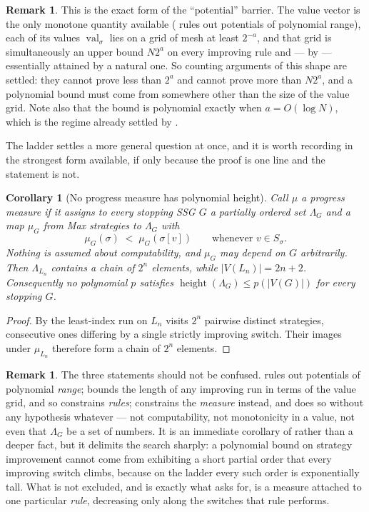 \documentclass[11pt]{article}
\theoremstyle{plain}
\newtheorem{corollary}[theorem]{Corollary}
\theoremstyle{definition}
\newtheorem{remark}[theorem]{Remark}
\DeclareMathOperator{\val}{val}
\begin{document}
\begin{remark}
This is the exact form of the ``potential'' barrier. The value vector is
the only monotone quantity available ( rules out
potentials of polynomial range), each of its values $\val_\sigma$ lies on
a grid of mesh at least $2^{-a}$, and
that grid is simultaneously an upper bound $N2^{a}$ on every improving
rule and --- by  --- essentially attained by a natural
one. So counting arguments of this shape are settled: they cannot prove
less than $2^{a}$ and cannot prove more than $N2^{a}$, and a polynomial
bound must come from somewhere other than the size of the value grid.
Note also that the bound is polynomial exactly when $a=O(\log N)$, which
is the regime already settled by .
\end{remark}

The ladder settles a more general question at once, and it is worth
recording in the strongest form available, if only because the proof is
one line and the statement is not.

\begin{corollary}[No progress measure has polynomial height]\label{cor:no-height}
Call $\mu$ a \emph{progress measure} if it assigns to every stopping SSG
$G$ a partially ordered set $\Lambda_G$ and a map $\mu_G$ from Max
strategies to $\Lambda_G$ with
\[
  \mu_G(\sigma)\;<\;\mu_G(\sigma[v])\qquad\text{whenever }v\in S_\sigma .
\]
Nothing is assumed about computability, and $\mu_G$ may depend on $G$
arbitrarily. Then $\Lambda_{L_n}$ contains a chain of $2^{n}$ elements, while
$|V(L_n)|=2n+2$. Consequently no polynomial $p$ satisfies
$\operatorname{height}(\Lambda_G)\le p(|V(G)|)$ for every stopping $G$.
\end{corollary}

\begin{proof}
By  the least-index run on $L_n$ visits $2^{n}$ pairwise
distinct strategies, consecutive ones differing by a single strictly
improving switch. Their images under $\mu_{L_n}$ therefore form a chain
of $2^{n}$ elements.
\end{proof}

\begin{remark}
The three statements should not be confused.
 rules out potentials of polynomial \emph{range};
 bounds the length of any improving run in terms
of the value grid, and so constrains \emph{rules};
 constrains the \emph{measure} instead, and does so
without any hypothesis whatever --- not computability, not monotonicity in
a value, not even that $\Lambda_G$ be a set of numbers. It is an
immediate corollary of  rather than a deeper fact, but
it delimits the search sharply: a polynomial bound on strategy
improvement cannot come from exhibiting a short partial order that every
improving switch climbs, because on the ladder every such order is
exponentially tall. What is not excluded, and is exactly what
 asks for, is a measure attached to one particular
\emph{rule}, decreasing only along the switches that rule performs.
\end{remark}
\end{document}
